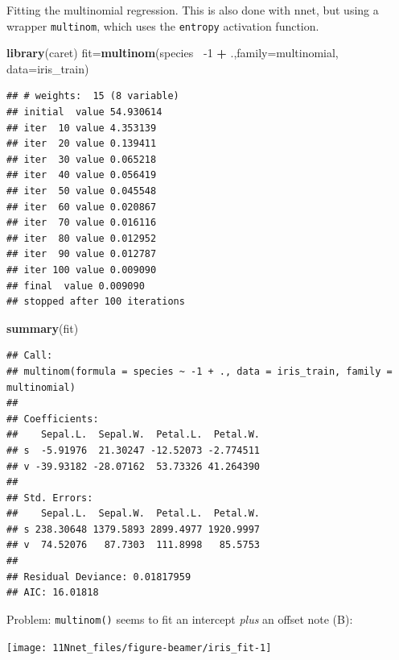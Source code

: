 \documentclass[10pt,ignorenonframetext,]{beamer}
\newenvironment{Shaded}{\begin{snugshade}}{\end{snugshade}}
\newcommand{\DataTypeTok}[1]{\textcolor[rgb]{0.13,0.29,0.53}{#1}}
\newcommand{\DecValTok}[1]{\textcolor[rgb]{0.00,0.00,0.81}{#1}}
\newcommand{\KeywordTok}[1]{\textcolor[rgb]{0.13,0.29,0.53}{\textbf{#1}}}
\newcommand{\NormalTok}[1]{#1}
\newcommand{\OperatorTok}[1]{\textcolor[rgb]{0.81,0.36,0.00}{\textbf{#1}}}
\newcommand{\StringTok}[1]{\textcolor[rgb]{0.31,0.60,0.02}{#1}}
\begin{document}
\begin{frame}[fragile]

Fitting the multinomial regression. This is also done with nnet, but
using a wrapper \texttt{multinom}, which uses the \texttt{entropy}
activation function.

\scriptsize

\begin{Shaded}
\begin{Highlighting}[]
\KeywordTok{library}\NormalTok{(caret)}
\NormalTok{fit=}\KeywordTok{multinom}\NormalTok{(species}\OperatorTok{~}\StringTok{ }\DecValTok{-1} \OperatorTok{+}\StringTok{ }\NormalTok{.,}\DataTypeTok{family=}\NormalTok{multinomial, }\DataTypeTok{data=}\NormalTok{iris_train)}
\end{Highlighting}
\end{Shaded}

\begin{verbatim}
## # weights:  15 (8 variable)
## initial  value 54.930614 
## iter  10 value 4.353139
## iter  20 value 0.139411
## iter  30 value 0.065218
## iter  40 value 0.056419
## iter  50 value 0.045548
## iter  60 value 0.020867
## iter  70 value 0.016116
## iter  80 value 0.012952
## iter  90 value 0.012787
## iter 100 value 0.009090
## final  value 0.009090 
## stopped after 100 iterations
\end{verbatim}

\begin{Shaded}
\begin{Highlighting}[]
\KeywordTok{summary}\NormalTok{(fit)}
\end{Highlighting}
\end{Shaded}

\begin{verbatim}
## Call:
## multinom(formula = species ~ -1 + ., data = iris_train, family = multinomial)
## 
## Coefficients:
##    Sepal.L.  Sepal.W.  Petal.L.  Petal.W.
## s  -5.91976  21.30247 -12.52073 -2.774511
## v -39.93182 -28.07162  53.73326 41.264390
## 
## Std. Errors:
##    Sepal.L.  Sepal.W.  Petal.L.  Petal.W.
## s 238.30648 1379.5893 2899.4977 1920.9997
## v  74.52076   87.7303  111.8998   85.5753
## 
## Residual Deviance: 0.01817959 
## AIC: 16.01818
\end{verbatim}

\end{frame}

\begin{frame}[fragile]

Problem: \texttt{multinom()} seems to fit an intercept \emph{plus} an
offset note (B):

\begin{center}\texttt{[image: 11Nnet\_files/figure-beamer/iris\_fit-1]} \end{center}

\end{frame}
\end{document}
